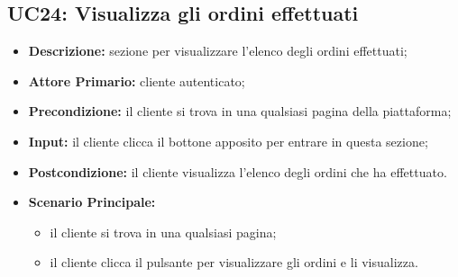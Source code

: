 \subsection{UC24: Visualizza gli ordini effettuati}
\label{sec:UC24}
\begin{itemize}
    \item \textbf{Descrizione:} sezione per visualizzare l'elenco degli ordini effettuati;
    \item \textbf{Attore Primario:} cliente autenticato;
    \item \textbf{Precondizione:} il cliente si trova in una qualsiasi pagina della piattaforma;
    \item \textbf{Input:} il cliente clicca il bottone apposito per entrare in questa sezione;
    \item \textbf{Postcondizione:} il cliente visualizza l'elenco degli ordini che ha effettuato.
    \item \textbf{Scenario Principale:}
          \begin{itemize}
              \item il cliente si trova in una qualsiasi pagina;
              \item il cliente clicca il pulsante per visualizzare gli ordini e li visualizza.
          \end{itemize}
\end{itemize}